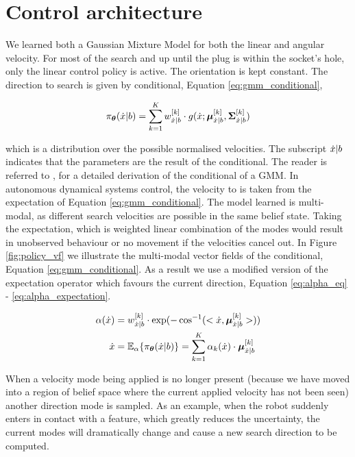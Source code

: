 \section{Control architecture}\label{seq:control_architecture}

We learned both a Gaussian Mixture Model for both the linear and angular 
velocity. For most of the search and up until the plug is within the socket's hole, only 
the linear control policy is active. The orientation is kept constant.
The direction to search is given by conditional, Equation \ref{eq:gmm_conditional},

\begin{equation}\label{eq:gmm_conditional}
 \pi_{\boldsymbol{\theta}}(\dot{x}|b) = \sum_{k=1}^{K} w^{[k]}_{\dot{x}|b} \cdot g(\dot{x};\boldsymbol{\mu}^{[k]}_{\dot{x}|b},\boldsymbol{\Sigma}^{[k]}_{\dot{x}|b})
\end{equation}

which is a distribution over the possible normalised velocities. The subscript $\dot{x}|b$ indicates that the parameters 
are the result of the conditional. The reader is referred to \cite{gesture_calinon_2010},\cite{gmr_2004} for 
a detailed derivation of the conditional of a GMM. In autonomous
dynamical systems control, the velocity to is taken from 
the expectation of Equation \ref{eq:gmm_conditional}. The model 
learned is multi-modal, as different search velocities are possible 
in the same belief state. Taking the expectation, which is weighted 
linear combination of the modes would result in unobserved behaviour or 
no movement if the velocities cancel out. In Figure \ref{fig:policy_vf}
we illustrate the multi-modal vector fields of the conditional, Equation \ref{eq:gmm_conditional}.
As a result we use a modified version of the expectation operator which favours the current
direction, Equation \ref{eq:alpha_eq} - \ref{eq:alpha_expectation}.

\begin{align}
 \alpha(\dot{x}) &= w^{[k]}_{\dot{x}|b} \cdot \exp(-\cos^{-1}(<\dot{x},\boldsymbol{\mu}^{[k]}_{\dot{x}|b}>)) \label{eq:alpha_eq}\\
 \dot{x} &= \mathbb{E}_{\alpha}\{\pi_{\boldsymbol{\theta}}(\dot{x}|b)\} = \sum_{k=1}^K \alpha_k(\dot{x}) \cdot \boldsymbol{\mu}^{[k]}_{\dot{x}|b} \label{eq:alpha_expectation}
\end{align}

When a velocity mode being applied is no longer present (because we have moved into a region of belief space where the current applied 
velocity has not been seen) another direction mode is sampled. As an example, when the robot suddenly enters in contact with a feature,
which greatly reduces the uncertainty, the current modes will dramatically change and cause a new search direction to be computed. 

